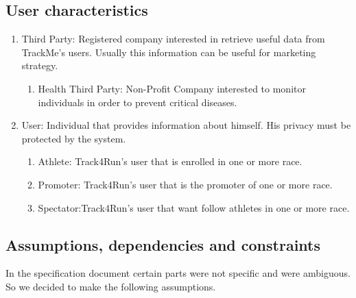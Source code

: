 \subsection{User characteristics}
\begin{enumerate}
\item Third Party: Registered company interested in retrieve useful data from TrackMe's users. Usually this information can be useful for marketing strategy.
	\begin{enumerate}
		\item Health Third Party: Non-Profit Company interested to monitor 		individuals in order to prevent critical diseases. 
	\end{enumerate}
\item User: Individual that provides information about himself. His privacy must be protected by the system.
	\begin{enumerate}
		\item Athlete: Track4Run's user that is enrolled in one or more race.
		\item Promoter: Track4Run's user that is the promoter of one or more race.
		\item Spectator:Track4Run's user that want follow athletes in one or more race.
	\end{enumerate}
\end{enumerate}

\subsection{Assumptions, dependencies and constraints}
In the specification document certain parts were not specific and were ambiguous. So we decided to make the following assumptions.

